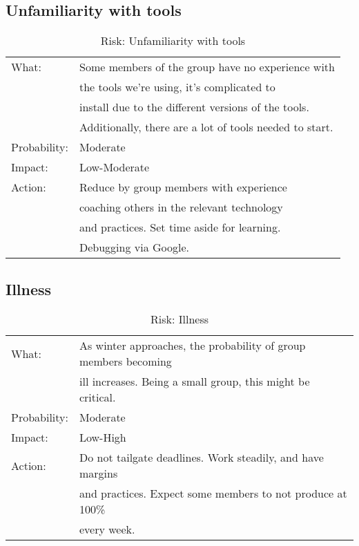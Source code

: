 \subsection{Unfamiliarity with tools}
\begin{table}[H]
\begin{tabular}{| l | l |}
	\hline
	What: & Some members of the group have no experience with\\
	& the tools we're using, it's complicated to\\
	& install due to the different versions of the tools. \\
	& Additionally, there are a lot of tools needed to start.\\
	\hline
	Probability: & Moderate \\
	\hline
	Impact: & Low-Moderate \\
	\hline
	Action: & Reduce by group members with experience \\
	& coaching others in the relevant technology\\
	& and practices. Set time aside for learning.\\
	& Debugging via Google.\\
	\hline
\end{tabular}
\caption{Risk: Unfamiliarity with tools}
\end{table}

\subsection{Illness}
\begin{table}[H]
\begin{tabular}{| l | l |}
	\hline
	What: & As winter approaches, the probability of group members becoming \\	 & ill increases. Being a small group, this might be critical.\\
	\hline
	Probability: & Moderate \\
	\hline
	Impact: & Low-High \\
	\hline
	Action: & Do not tailgate deadlines. Work steadily, and have margins\\
	&and practices. Expect some members to not produce at 100\%\\	& every week.\\
	\hline
\end{tabular}
\caption{Risk: Illness}
\end{table}

